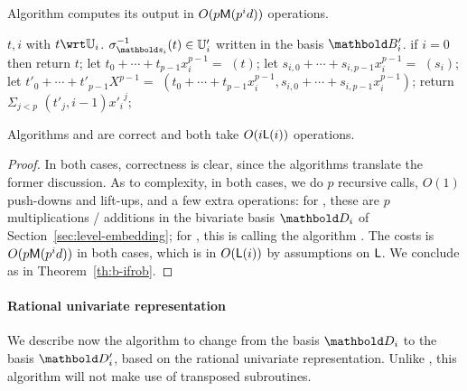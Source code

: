 \begin{lemma}
  \label{th:rur-s}
  Algorithm  computes its output in
  $O(p\mathsf{M}(p^id))$ operations.
\end{lemma}

\begin{algorithm}
  \caption{} 
  \label{alg:applyinverse}
  \begin{algorithmic}[1]
    \REQUIRE $t,i$ with $t \wrt \U_i$.
    \ENSURE $\sigma_{\lst{s}_i}^{-1}(t)\in \U'_i$ written in the basis $\basis{B}'_i$.
    \STATE if $i=0$ then return $t$;
    \STATE let $t_0 + \cdots + t_{p-1}x_i^{p-1} =$ $(t)$;
    \STATE let $s_{i,0}+\cdots+s_{i,p-1}x_i^{p-1}=$ $(s_i)$;
    \STATE let $t'_0 + \cdots + t'_{p-1}X^{p-1} =$ $(t_0 + \cdots + t_{p-1}x_i^{p-1}, s_{i,0}+\cdots+s_{i,p-1}x_i^{p-1})$;
  \STATE return $\Sigma_{j < p}$ $(t'_j, i-1) {x'_i}^j$;
\end{algorithmic}
\end{algorithm}

\begin{proposition}\label{Prop:apply}
  Algorithms  and
   are correct and both take $O(i\mathsf{L}(i))$
  operations.
\end{proposition}
\begin{proof}
  In both cases, correctness is clear, since the algorithms translate
  the former discussion. As to complexity, in both cases, we do $p$
  recursive calls, $O(1)$ push-downs and lift-ups, and a few extra
  operations: for , these are $p$
  multiplications / additions in the bivariate basis $\basis{D}_i$ of
  Section~\ref{sec:level-embedding}; for , this is
  calling the algorithm
  .  The costs is
  $O(p\mathsf{M}(p^id))$ in both cases, which is in $O(\mathsf{L}(i))$ by
  assumptions on $\mathsf{L}$. We conclude as in Theorem~\ref{th:b-ifrob}.
\end{proof}


\paragraph{Rational univariate representation}
We describe now the algorithm to change from the basis $\basis{D}_i$
to the basis $\basis{D}_i'$, based on the rational univariate
representation. Unlike , this algorithm will not make use
of transposed subroutines.

